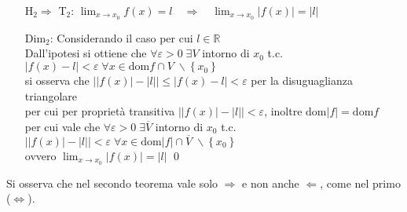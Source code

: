 \documentclass[a4paper]{article}
\newcommand\dom{\text{dom}}
\begin{document}
\begin{itemize}
	\item[H\(_2 \Rightarrow\) T\(_2\):] \(\displaystyle \lim_{x \to x_0} f(x) = l \quad \Rightarrow \quad \lim_{x \to x_0} \left| f(x) \right| = \left| l \right|\)
	\item[Dim\(_2\):] Considerando il caso per cui \(l \in \mathbb{R}\) \\
	Dall'ipotesi si ottiene che \(\forall \varepsilon > 0 \; \exists V\) intorno di \(x_0\) t.c. \(\left| f(x) - l \right| < \varepsilon \; \forall x \in \dom f \cap V \; \backslash \left\{ x_0 \right\}\) \\
	si osserva che \(\left| \left| f(x) \right| - \left| l \right| \right| \leq \left| f(x) - l \right| < \varepsilon\) per la disuguaglianza triangolare \\
	per cui per proprietà transitiva \(\left| \left| f(x) \right| - \left| l \right| \right| < \varepsilon\), inoltre \(\dom \left| f \right| = \dom f\)\\
	per cui vale che \( \forall \varepsilon > 0 \; \exists \overline{V}\) intorno di \(x_0\) t.c. \(\left| \left| f(x) \right| - \left| l \right| \right| < \varepsilon \; \forall x \in \dom \left| f \right| \cap \overline{V} \; \backslash \left\{ x_0 \right\}\) \\
	ovvero \(\displaystyle \lim_{x \to x_0} \left| f(x) \right| = \left| l \right|\) \qed
\end{itemize}
Si osserva che nel secondo teorema vale solo \(\Rightarrow\) e non anche \(\Leftarrow\), come nel primo (\(\Leftrightarrow\)). 
\newpage
\end{document}
